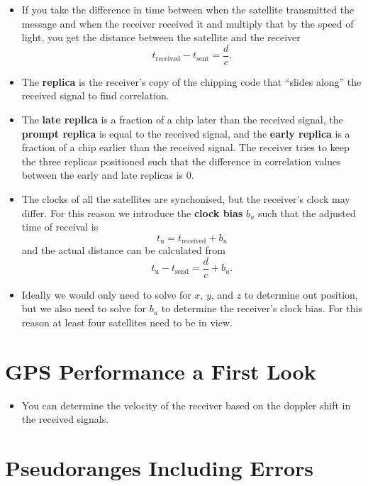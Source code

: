 \documentclass{article}
\begin{document}
\begin{itemize}
  \item If you take the difference in time between when the satellite transmitted the message and when the receiver received it and multiply that by the speed of light, you get the distance between the satellite and the receiver \[t_\text{received} - t_\text{sent} = \frac{d}{c}.\]

  \item The \textbf{replica} is the receiver's copy of the chipping code that ``slides along'' the received signal to find correlation.

  \item The \textbf{late replica} is a fraction of a chip later than the received signal, the \textbf{prompt replica} is equal to the received signal, and the \textbf{early replica} is a fraction of a chip earlier than the received signal. The receiver tries to keep the three replicas positioned such that the difference in correlation values between the early and late replicas is $0$.

  \item The clocks of all the satellites are synchonised, but the receiver's clock may differ. For this reason we introduce the \textbf{clock bias} $b_u$ such that the adjusted time of receival is \[t_\text{u} = t_\text{received} + b_u\] and the actual distance can be calculated from \[t_\text{u} - t_\text{send} = \frac{d}{c} + b_u.\]

  \item Ideally we would only need to solve for $x$, $y$, and $z$ to determine out position, but we also need to solve for $b_u$ to determine the receiver's clock bias. For this reason at least four satellites need to be in view.
\end{itemize}

\section{GPS Performance a First Look}

\begin{itemize}
  \item You can determine the velocity of the receiver based on the doppler shift in the received signals.
\end{itemize}

\section{Pseudoranges Including Errors}
\end{document}

